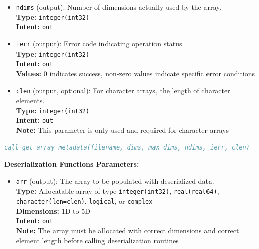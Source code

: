 \begin{enumerate}
\begin{enumerate}
\begin{itemize}
                    \item \texttt{ndims} (output): Number of dimensions actually used by
                          the array. \\ \textbf{Type:} \texttt{integer(int32)} \\ \textbf{Intent:}
                          \texttt{out}
                          
                    \item \texttt{ierr} (output): Error code indicating operation status.
                          \\ \textbf{Type:} \texttt{integer(int32)} \\ \textbf{Intent:} \texttt{out}
                          \\ \textbf{Values:} 0 indicates success, non-zero values indicate
                          specific error conditions
                          
                    \item \texttt{clen} (output, optional): For character arrays, the length
                          of character elements. \\ \textbf{Type:} \texttt{integer(int32)}
                          \\ \textbf{Intent:} \texttt{out} \\ \textbf{Note:} This parameter is
                          only used and required for character arrays
                  \end{itemize}
                  \begin{lstlisting}[language=fortran, caption={Usage of metadata retrieval}]
call get_array_metadata(filename, dims, max_dims, ndims, ierr, clen)
                  \end{lstlisting}
                  
                  \textbf{Deserialization Functions Parameters:}
                  \begin{itemize}
                    \item \texttt{arr} (output): The array to be populated with deserialized
                          data. \\ \textbf{Type:} Allocatable array of type \texttt{integer(int32)},
                          \texttt{real(real64)}, \texttt{character(len=clen)}, \texttt{logical},
                          or \texttt{complex} \\ \textbf{Dimensions:} 1D to 5D \\ \textbf{Intent:}
                          \texttt{out} \\ \textbf{Note:} The array must be allocated with
                          correct dimensions and correct element length before calling
                          deserialization routines
                          

\end{itemize}
\end{enumerate}
\end{enumerate}
